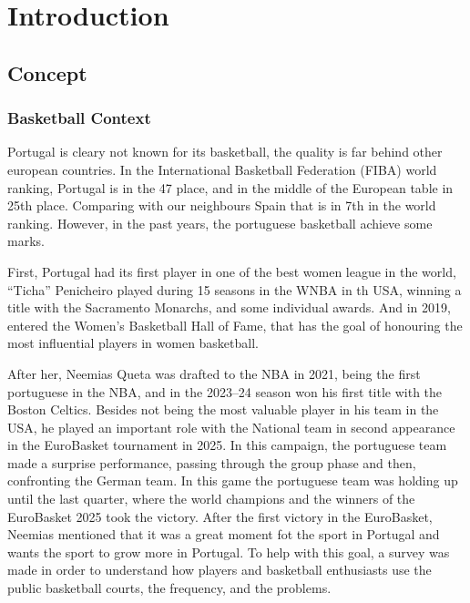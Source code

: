 \chapter{Introduction}%
\label{chapter:introduction}

\begin{introduction}

\end{introduction}

\section{Concept}\label{sec:concept}

\subsection{Basketball Context}\label{subsec:basketball-context}
Portugal is cleary not known for its basketball, the quality is far behind other european countries.
In the International Basketball Federation (FIBA) world ranking\cite{fiba}, Portugal is in the 47 place, and in the middle of the European table in 25th place.
Comparing with our neighbours Spain that is in 7th in the world ranking.
However, in the past years, the portuguese basketball achieve some marks.

First, Portugal had its first player in one of the best women league in the world, ``Ticha'' Penicheiro played during 15 seasons in the WNBA in th USA, winning a title with the Sacramento Monarchs, and some individual awards.
And in 2019, entered the Women’s Basketball Hall of Fame, that has the goal of honouring the most influential players in women basketball.\cite{ticha}

After her, Neemias Queta was drafted to the NBA in 2021, being the first portuguese in the NBA, and in the 2023--24 season won his first title with the Boston Celtics.
Besides not being the most valuable player in his team in the USA, he played an important role with the National team in second appearance in the EuroBasket tournament in 2025.
In this campaign, the portuguese team made a surprise performance, passing through the group phase and then, confronting the German team.
In this game the portuguese team was holding up until the last quarter, where the world champions and the winners of the EuroBasket 2025 took the victory.
After the first victory in the EuroBasket, Neemias mentioned that it was a great moment fot the sport in Portugal and wants the sport to grow more in Portugal.\cite{neemias}
To help with this goal, a survey was made in order to understand how players and basketball enthusiasts use the public basketball courts, the frequency, and the problems.

